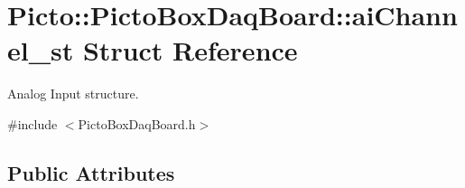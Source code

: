 \hypertarget{struct_picto_1_1_picto_box_daq_board_1_1ai_channel__st}{\section{Picto\-:\-:Picto\-Box\-Daq\-Board\-:\-:ai\-Channel\-\_\-st Struct Reference}
\label{struct_picto_1_1_picto_box_daq_board_1_1ai_channel__st}
}


Analog Input structure.  




{\ttfamily \#include $<$Picto\-Box\-Daq\-Board.\-h$>$}

\subsection*{Public Attributes}
